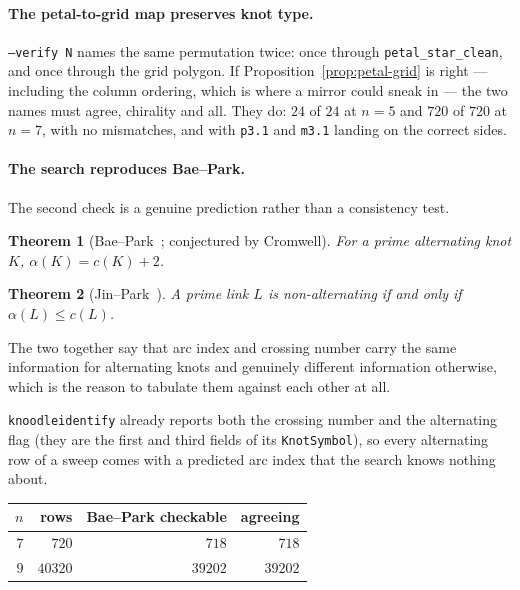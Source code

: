 \documentclass[11pt,oneside]{report}
\newtheorem{theorem}{Theorem}[chapter]
\theoremstyle{definition}
\begin{document}
\paragraph{The petal-to-grid map preserves knot type.}
\texttt{--verify N} names the same permutation twice: once through
\texttt{petal\_star\_clean}, and once through the grid polygon. If
Proposition~\ref{prop:petal-grid} is right --- including the column
ordering, which is where a mirror could sneak in --- the two names must
agree, chirality and all. They do: $24$ of $24$ at $n = 5$ and $720$ of
$720$ at $n = 7$, with no mismatches, and with \texttt{p3.1} and
\texttt{m3.1} landing on the correct sides.

\paragraph{The search reproduces Bae--Park.}
The second check is a genuine prediction rather than a consistency test.

\begin{theorem}[Bae--Park~\cite{BaePark}; conjectured by Cromwell]
For a prime alternating knot $K$, $\alpha(K) = c(K) + 2$.
\end{theorem}

\begin{theorem}[Jin--Park~\cite{JinPark}]
A prime link $L$ is non-alternating if and only if $\alpha(L) \leq c(L)$.
\end{theorem}

\noindent
The two together say that arc index and crossing number carry the same
information for alternating knots and genuinely different information
otherwise, which is the reason to tabulate them against each other at all.

\texttt{knoodleidentify} already reports both the crossing number and the
alternating flag (they are the first and third fields of its
\texttt{KnotSymbol}), so every alternating row of a sweep comes with a
predicted arc index that the search knows nothing about.

\begin{center}
\begin{tabular}{@{}rrrr@{}}
\hline
$n$ & rows & Bae--Park checkable & agreeing \\
\hline
$7$ & $720$   & $718$   & $718$   \\
$9$ & $40320$ & $39202$ & $39202$ \\
\hline
\end{tabular}
\end{center}
\end{document}
